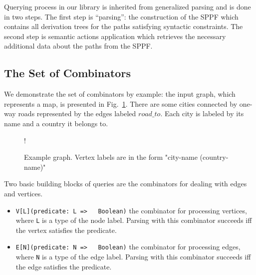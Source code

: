 Querying process in our library is inherited from generalized parsing and is done in two steps.
The first step is ``parsing'': the construction of the SPPF which contains all derivation trees for the paths satisfying syntactic constraints.
The second step is semantic actions application which retrieves the necessary additional data about the paths from the SPPF.

\subsection{The Set of Combinators}

We demonstrate the set of combinators by example: the input graph, which represents a map, is presented in Fig.~\ref{fig:graph}.
There are some cities connected by one-way roads represented by the edges labeled $road\_to$.
Each city is labeled by its name and a country it belongs to.

\begin{figure}[h]
 {!}
{
}
\caption{Example graph. Vertex labels are in the form "city-name (country-name)"}
\label{fig:graph}
\end{figure}

Two basic building blocks of queries are the combinators for dealing with edges and vertices.
\begin{itemize}
    \item \lstinline{V[L](predicate: L =>   Boolean)} the combinator for processing vertices, where \lstinline{L} is a type of the node label.
    Parsing with this combinator succeeds iff the vertex satisfies the predicate.
    \item \lstinline{E[N](predicate: N =>   Boolean)} the combinator for processing edges, where \lstinline{N} is a type of the edge label.
    Parsing with this combinator succeeds iff the edge satisfies the predicate.
\end{itemize}

